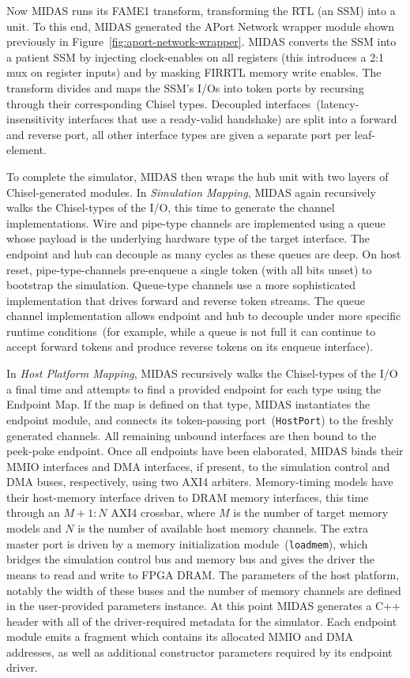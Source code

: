 Now MIDAS runs its FAME1 transform, transforming the RTL (an SSM) into a
unit. To this end, MIDAS generated the APort Network wrapper module shown previously in Figure~\ref{fig:aport-network-wrapper}.
MIDAS converts the SSM into a patient SSM by injecting clock-enables
on all registers (this introduces a 2:1 mux on register inputs) and by
masking FIRRTL memory write enables. The transform divides and maps the
SSM's I/Os into token ports by recursing through their corresponding Chisel types.
Decoupled interfaces~(latency-insensitivity interfaces that use a ready-valid
handshake) are split into a forward and reverse port, all other
interface types are given a separate port per leaf-element.

To complete the simulator, MIDAS then wraps the hub unit with two layers of Chisel-generated modules.
In \emph{Simulation Mapping}, MIDAS again recursively walks the Chisel-types of the I/O, this time
to generate the channel implementations.  Wire and pipe-type channels are implemented using a queue whose
payload is the underlying hardware type of the target interface. The endpoint and hub can decouple
as many cycles as these queues are deep. On host reset, pipe-type-channels
pre-enqueue a single token (with all bits unset) to bootstrap the simulation.
Queue-type channels use a more sophisticated implementation
that drives forward and reverse token streams. The queue channel
implementation allows endpoint and hub to decouple under more specific runtime conditions~(for example,
while a queue is not full it can continue to accept forward tokens and produce reverse tokens on its enqueue interface).

In \emph{Host Platform Mapping}, MIDAS recursively walks the Chisel-types
of the I/O a final time and attempts to find a provided endpoint for
each type using the Endpoint Map. If the map is defined on that type, MIDAS
instantiates the endpoint module, and connects its token-passing port~(\texttt{HostPort}) to the freshly
generated channels. All remaining unbound interfaces are then bound to the
peek-poke endpoint. Once all endpoints have been elaborated, MIDAS binds their
MMIO interfaces and DMA interfaces, if present, to the simulation control
and DMA buses, respectively, using two AXI4 arbiters. Memory-timing
models have their host-memory interface driven to DRAM memory interfaces,
this time through an $M+1:N$ AXI4 crossbar, where $M$ is the number of
target memory models and $N$ is the number of available host memory channels. The
extra master port is driven by a memory initialization module~(\texttt{loadmem}), which bridges the
simulation control bus and memory bus and gives the driver the means to
read and write to FPGA DRAM. The parameters of the host platform,
notably the width of these buses and the number of memory channels
are defined in the user-provided parameters instance. At this point MIDAS
generates a C++ header with all of the driver-required metadata for the
simulator. Each endpoint module emits a fragment which contains its allocated MMIO and
DMA addresses, as well as additional constructor parameters required by its
endpoint driver.

